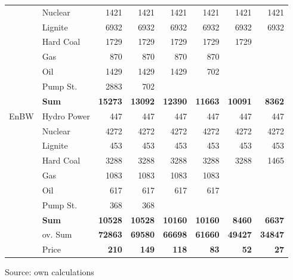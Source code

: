 \begin{table}[htb]
\begin{tabular}{llrrrrrr}
           &    Nuclear &       1421 &       1421 &       1421 &       1421 &       1421 &       1421 \\

           &    Lignite &       6932 &       6932 &       6932 &       6932 &       6932 &       6932 \\

           &  Hard Coal &       1729 &       1729 &       1729 &       1729 &       1729 &            \\

           &        Gas &        870 &        870 &        870 &        870 &            &            \\

           &        Oil &       1429 &       1429 &       1429 &        702 &            &            \\

           &   Pump St. &       2883 &        702 &            &            &            &            \\

           &  {\bf Sum} & {\bf 15273} & {\bf 13092} & {\bf 12390} & {\bf 11663} & {\bf 10091} & {\bf 8362} \\
\hline
      EnBW & Hydro Power &        447 &        447 &        447 &        447 &        447 &        447 \\

           &    Nuclear &       4272 &       4272 &       4272 &       4272 &       4272 &       4272 \\

           &    Lignite &        453 &        453 &        453 &        453 &        453 &        453 \\

           &  Hard Coal &       3288 &       3288 &       3288 &       3288 &       3288 &       1465 \\

           &        Gas &       1083 &       1083 &       1083 &       1083 &            &            \\

           &        Oil &        617 &        617 &        617 &        617 &            &            \\

           &   Pump St. &        368 &        368 &            &            &            &            \\

           &  {\bf Sum} & {\bf 10528} & {\bf 10528} & {\bf 10160} & {\bf 10160} & {\bf 8460} & {\bf 6637} \\
\hline
           &    ov. Sum & {\bf 72863} & {\bf 69580} & {\bf 66698} & {\bf 61660} & {\bf 49427} & {\bf 34847} \\
\hline
           &      Price &  {\bf 210} &  {\bf 149} &  {\bf 118} &   {\bf 83} &   {\bf 52} &   {\bf 27} \\
\hline
\hline
\end{tabular}
\begin{center}
Source: own calculations
\end{center}
\end{table}

